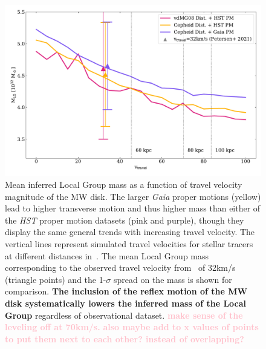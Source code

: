 \documentclass[twocolumn]{aastex631}
\newcommand{\kc}[1]{\textcolor{pink}{\textbf{#1}} }
\begin{document}
\begin{figure}[htb]
    \centering
    \includegraphics[width=\columnwidth]{analyze-runs-MvV.pdf}
    \caption{\label{fig:mvsv}
    Mean inferred Local Group mass as a function of travel velocity
    magnitude of the MW disk.
    The larger \textit{Gaia} proper motions (yellow) lead to higher transverse
    motion and thus higher mass than either of the \textit{HST} proper motion
    datasets (pink and purple), though they display the same general trends with increasing travel velocity.
    The vertical lines represent simulated travel velocities for
    stellar tracers at different distances in~\cite{Garavito-Camargo2021b}.
    The mean Local Group mass corresponding to the observed travel velocity
    from~\cite{Petersen2021} of 32km/s (triangle points) and the 1-$\sigma$
    spread on the mass is shown for comparison.
    \textbf{The inclusion of the reflex motion of the MW disk systematically
    lowers the inferred mass of the Local Group} regardless of observational
    dataset.
    \kc{make sense of the leveling off at 70km/s.}
    \kc{also maybe add to x values of points to put them next to each other?
    instead of overlapping?}
    }
  \end{figure}
\end{document}
